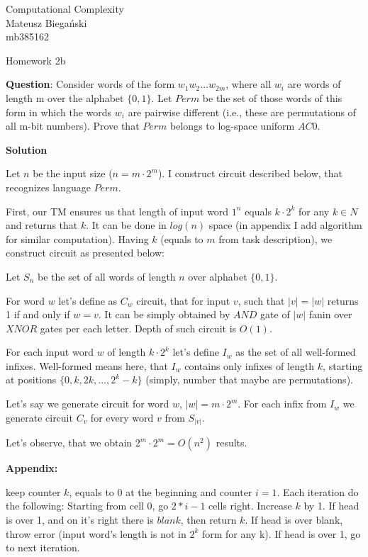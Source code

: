 \documentclass[12pt]{article}
\begin{document}

\begin{flushright}
    Computational Complexity \\
    Mateusz Biegański \\ 
    mb385162
\end{flushright}

\begin{center}
    \Large Homework 2b \normalsize
\end{center}

\textbf{Question}:
Consider words of the form $w_1w_2 ...w_{2m}$, where all $w_i$ are words of
length m over the alphabet $\{0, 1\}$. Let $Perm$ be the set of those words of this form in which the
words $w_i$ are pairwise different (i.e., these are permutations of all m-bit numbers). Prove that
$Perm$ belongs to log-space uniform $AC0$.



{\bf Solution}

Let $n$ be the input size ($n = m \cdot 2^m$). I construct circuit described below, that recognizes language $Perm$.

First, our TM ensures us that length of input word $1^n$ equals $k\cdot2^k$ for any $k \in N$ and returns that $k$. It can be done in $log(n)$ space (in appendix I add algorithm for similar computation).
Having $k$ (equals to $m$ from task description), we construct circuit as presented below:

Let $S_n$ be the set of all words of length $n$ over alphabet $\{0,1\}$.

For word $w$ let's define as $C_w$ circuit, that for input $v$, such that $|v| = |w|$ returns 1 if and only if $w = v$. It can be simply obtained by $AND$ gate of $|w|$ fanin over $XNOR$ gates per each letter. Depth of such circuit is $O(1)$.

For each input word $w$ of length $k\cdot2^k$ let's define $I_{w}$ as the set of all well-formed infixes. Well-formed means here, that $I_w$ contains only infixes of length $k$, starting at positions $\{0, k, 2k, ... , 2^k - k\}$ (simply, number that maybe are permutations).

Let's say we generate circuit for word $w$, $|w| = m\cdot2^m$.
For each infix from $I_w$ we generate circuit $C_v$ for every word $v$ from $S_{|v|}$.

Let's observe, that we obtain $2^m \cdot 2^m = O(n^2)$ results.


\textbf{Appendix:}

keep counter $k$, equals to 0 at the beginning and counter $i = 1$. Each iteration do the following:
Starting from cell 0, go $2*i - 1$ cells right. Increase $k$ by 1. If head is over 1, and on it's right there is $blank$, then return $k$. If head is over blank, throw error (input word's length is not in $2^k$ form for any k). If head is over 1, go to next iteration.
\end{document}
